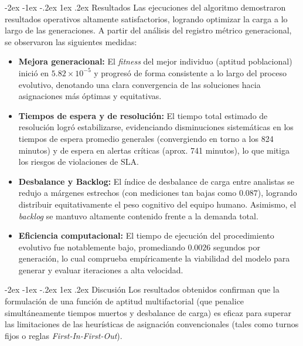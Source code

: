 \documentclass[12pt,a4paper,twocolumn]{article}
\makeatletter
\renewcommand{\section}{\@startsection{section}{1}{\z@}%
  {-2ex \@plus -1ex \@minus -.2ex}%
  {1ex \@plus.2ex}%
  {\fontsize{12}{14}\selectfont\bfseries}}
\makeatother
\begin{document}
\section{Resultados}
Las ejecuciones del algoritmo demostraron resultados operativos altamente satisfactorios, logrando optimizar la carga a lo largo de las generaciones. A partir del análisis del registro métrico generacional, se observaron las siguientes medidas:

\begin{itemize}
    \item \textbf{Mejora generacional:} El \textit{fitness} del mejor individuo (aptitud poblacional) inició en $5.82\times 10^{-5}$ y progresó de forma consistente a lo largo del proceso evolutivo, denotando una clara convergencia de las soluciones hacia asignaciones más óptimas y equitativas.
    \item \textbf{Tiempos de espera y de resolución:} El tiempo total estimado de resolución logró estabilizarse, evidenciando disminuciones sistemáticas en los tiempos de espera promedio generales (convergiendo en torno a los 824 minutos) y de espera en alertas críticas (aprox. 741 minutos), lo que mitiga los riesgos de violaciones de SLA.
    \item \textbf{Desbalance y Backlog:} El índice de desbalance de carga entre analistas se redujo a márgenes estrechos (con mediciones tan bajas como $0.087$), logrando distribuir equitativamente el peso cognitivo del equipo humano. Asimismo, el \textit{backlog} se mantuvo altamente contenido frente a la demanda total.
    \item \textbf{Eficiencia computacional:} El tiempo de ejecución del procedimiento evolutivo fue notablemente bajo, promediando $0.0026$ segundos por generación, lo cual comprueba empíricamente la viabilidad del modelo para generar y evaluar iteraciones a alta velocidad.
\end{itemize}

\section{Discusión}
Los resultados obtenidos confirman que la formulación de una función de aptitud multifactorial (que penalice simultáneamente tiempos muertos y desbalance de carga) es eficaz para superar las limitaciones de las heurísticas de asignación convencionales (tales como turnos fijos o reglas \textit{First-In-First-Out}). 
\end{document}
